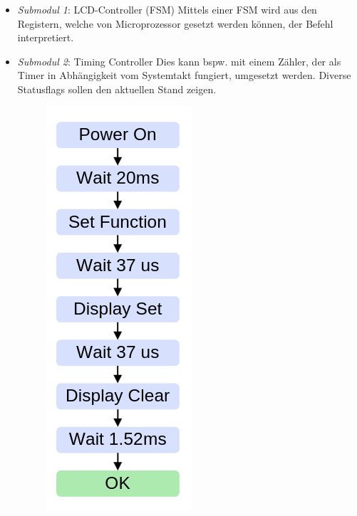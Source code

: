 \begin{itemize}
    \item \textit{Submodul 1}: LCD-Controller (FSM) \newline
    Mittels einer FSM wird aus den Registern, welche von Microprozessor gesetzt werden können, der Befehl interpretiert.
    \item \textit{Submodul 2}: Timing Controller \newline
    Dies kann bspw. mit einem Zähler, der als Timer in Abhängigkeit vom Systemtakt fungiert, umgesetzt werden.
    Diverse Statusflags sollen den aktuellen Stand zeigen.\newline
    \begin{figure}[h!]
        \centering
        \begin{minipage}{0.15\textwidth}
            \includegraphics[width=\linewidth]{./images/lcd_timing.png} %
     
\end{minipage}
\end{figure}
\end{itemize}

